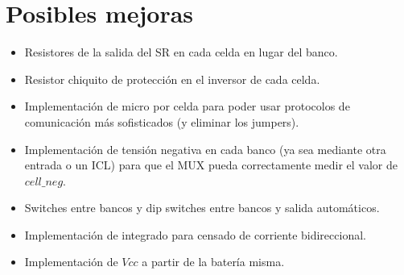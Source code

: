 \section{Posibles mejoras}

\begin{itemize}
    \item Resistores de la salida del SR en cada celda en lugar del banco.
    \item Resistor chiquito de protección en el inversor de cada celda.
    \item Implementación de micro por celda para poder usar protocolos de comunicación más sofisticados (y eliminar los jumpers).
    \item Implementación de tensión negativa en cada banco (ya sea mediante otra entrada o un ICL) para que el MUX pueda correctamente medir el valor de $cell\_neg$.
    \item Switches entre bancos y dip switches entre bancos y salida automáticos.
    \item Implementación de integrado para censado de corriente bidireccional.
    \item Implementación de $Vcc$ a partir de la batería misma.
\end{itemize}

